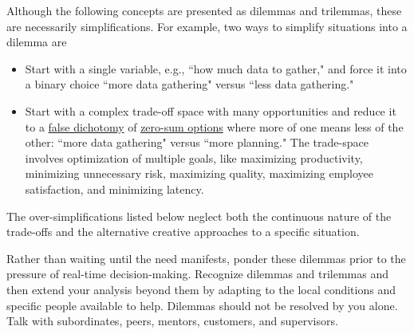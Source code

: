 Although the following concepts are presented as dilemmas and trilemmas, these are necessarily simplifications. For example, two ways to simplify situations into a dilemma are
\begin{itemize}
    \item Start with a single variable, e.g., ``how much data to gather," and force it into a binary choice ``more data gathering" versus ``less data gathering."
    
    \item Start with a complex trade-off space with many opportunities and reduce it to a \href{https://en.wikipedia.org/wiki/False_dilemma}{false dichotomy} 
    \iftoggle{WPinmargin}{ \marginpar{$>$Wikipedia: False\\dilemma}}{}
    of 
    \href{https://en.wikipedia.org/wiki/Zero-sum_thinking}{zero-sum options} where more of one means less of the other: 
    ``more data gathering" versus ``more planning." The  trade-space involves optimization of multiple goals, like maximizing productivity, minimizing unnecessary risk, maximizing quality, maximizing employee satisfaction, and minimizing latency. 
\end{itemize}
The over-simplifications listed below neglect both the continuous nature of the trade-offs and the alternative creative approaches to a specific situation. 





Rather than waiting until the need manifests, ponder these dilemmas prior to the pressure of real-time decision-making.  Recognize dilemmas and trilemmas and then extend your analysis beyond them by adapting to the local conditions and specific people available to help.
Dilemmas should not be resolved by you alone. Talk with subordinates, peers, mentors, customers, and supervisors.


